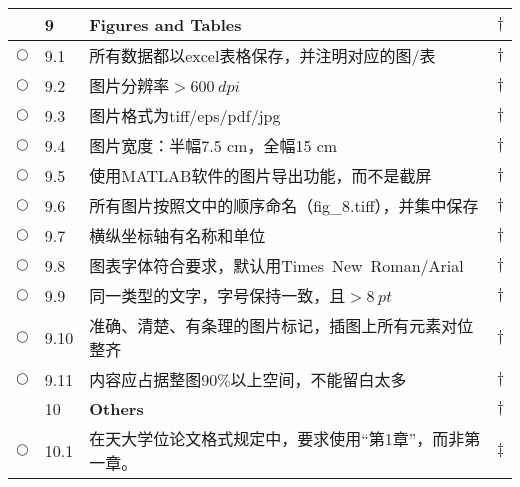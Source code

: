 \documentclass{ctexart}
\begin{document}
\begin{center}
\begin{longtable}{|l|l|p{}|l|}
 & 9 & \textcolor[rgb]{0.00,0.00,1.00}{\textbf{Figures and Tables}}& $\dagger$\\\hline
$\bigcirc$& 9.1 & 所有数据都以excel表格保存，并注明对应的图/表 & $\dagger$\\\hline
$\bigcirc$& 9.2 & 图片分辨率$>600~dpi$ & $\dagger$\\\hline
$\bigcirc$& 9.3 & 图片格式为tiff/eps/pdf/jpg & $\dagger$\\\hline
$\bigcirc$& 9.4 & 图片宽度：半幅7.5 cm，全幅15 cm& $\dagger$\\\hline
$\bigcirc$& 9.5 & 使用MATLAB软件的图片导出功能，而不是截屏& $\dagger$\\\hline
$\bigcirc$& 9.6 & 所有图片按照文中的顺序命名（fig\_8.tiff），并集中保存& $\dagger$\\\hline
$\bigcirc$& 9.7 & 横纵坐标轴有名称和单位& $\dagger$\\\hline
$\bigcirc$& 9.8 & 图表字体符合要求，默认用Times New Roman/Arial& $\dagger$\\\hline
$\bigcirc$& 9.9 & 同一类型的文字，字号保持一致，且$>8~pt$& $\dagger$\\\hline
$\bigcirc$& 9.10 & 准确、清楚、有条理的图片标记，插图上所有元素对位整齐 & $\dagger$\\\hline
$\bigcirc$& 9.11 & 内容应占据整图$90\%$以上空间，不能留白太多& $\dagger$\\\hline
\hline

 & 10 & \textcolor[rgb]{0.00,0.00,1.00}{\textbf{Others}}& $\dagger$\\\hline
$\bigcirc$& 10.1 & 在天大学位论文格式规定中，要求使用“第1章”，而非第一章。 & $\ddagger$\\\hline
\end{longtable}

\end{center}
\end{document}
